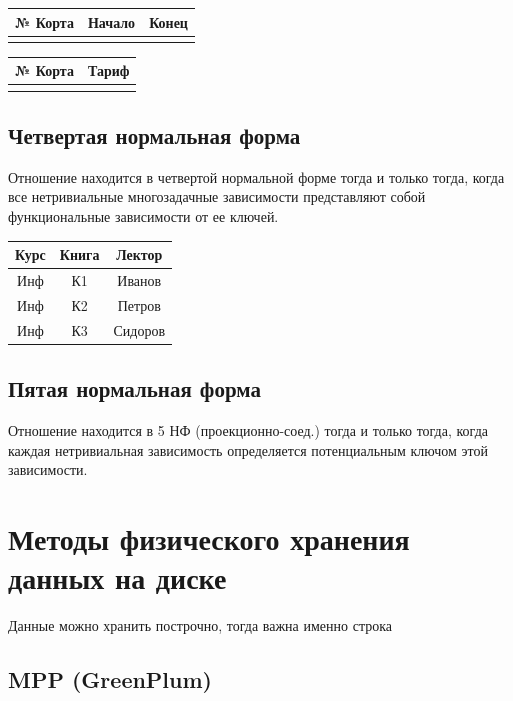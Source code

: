 \documentclass[a4paper, 14pt]{report}
\begin{document}
\begin{table}[H]
    \centering
    \begin{tabular}{|c|c|c|}
        \hline
        № Корта & Начало & Конец \\
        \hline
        & & \\
    \end{tabular}

    \begin{tabular}{|c|c|}
        \hline
        № Корта & Тариф \\
        \hline
                & \\
    \end{tabular}
\end{table}

\subsection{Четвертая нормальная форма}

Отношение находится в четвертой нормальной форме тогда и только тогда, когда все
нетривиальные многозадачные зависимости представляют собой функциональные зависимости
от ее ключей.

\begin{table}[H]
    \centering
    \begin{tabular}{|c|c|c|}
        \hline
        Курс & Книга & Лектор \\
        \hline
        Инф & К1 & Иванов \\
        Инф & К2 & Петров \\
        Инф & К3 & Сидоров \\
        \hline
    \end{tabular}
\end{table}

\subsection{Пятая нормальная форма}

Отношение находится в 5 НФ (проекционно-соед.) тогда и только тогда,
когда каждая нетривиальная зависимость определяется потенциальным
ключом этой зависимости.

\section{Методы физического хранения данных на диске}

Данные можно хранить построчно, тогда важна именно строка

\subsection{MPP (GreenPlum)}
\end{document}
